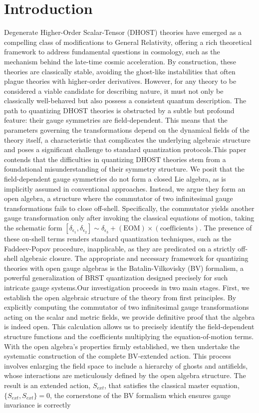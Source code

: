 \documentclass[twocolumn]{aastex631}
\begin{document}
\section{Introduction}
\label{sec:intro}
Degenerate Higher-Order Scalar-Tensor (DHOST) theories have emerged as a compelling class of modifications to General Relativity, offering a rich theoretical framework to address fundamental questions in cosmology, such as the mechanism behind the late-time cosmic acceleration. By construction, these theories are classically stable, avoiding the ghost-like instabilities that often plague theories with higher-order derivatives. However, for any theory to be considered a viable candidate for describing nature, it must not only be classically well-behaved but also possess a consistent quantum description. The path to quantizing DHOST theories is obstructed by a subtle but profound feature: their gauge symmetries are field-dependent. This means that the parameters governing the transformations depend on the dynamical fields of the theory itself, a characteristic that complicates the underlying algebraic structure and poses a significant challenge to standard quantization protocols.This paper contends that the difficulties in quantizing DHOST theories stem from a foundational misunderstanding of their symmetry structure. We posit that the field-dependent gauge symmetries do not form a closed Lie algebra, as is implicitly assumed in conventional approaches. Instead, we argue they form an open algebra, a structure where the commutator of two infinitesimal gauge transformations fails to close off-shell. Specifically, the commutator yields another gauge transformation only after invoking the classical equations of motion, taking the schematic form $[\delta_{\epsilon_1}, \delta_{\epsilon_2}] \sim \delta_{\epsilon_3} + (\text{EOM}) \times (\text{coefficients})$. The presence of these on-shell terms renders standard quantization techniques, such as the Faddeev-Popov procedure, inapplicable, as they are predicated on a strictly off-shell algebraic closure. The appropriate and necessary framework for quantizing theories with open gauge algebras is the Batalin-Vilkovisky (BV) formalism, a powerful generalization of BRST quantization designed precisely for such intricate gauge systems.Our investigation proceeds in two main stages. First, we establish the open algebraic structure of the theory from first principles. By explicitly computing the commutator of two infinitesimal gauge transformations acting on the scalar and metric fields, we provide definitive proof that the algebra is indeed open. This calculation allows us to precisely identify the field-dependent structure functions and the coefficients multiplying the equation-of-motion terms. With the open algebra's properties firmly established, we then undertake the systematic construction of the complete BV-extended action. This process involves enlarging the field space to include a hierarchy of ghosts and antifields, whose interactions are meticulously defined by the open algebra structure. The result is an extended action, $S_{ext}$, that satisfies the classical master equation, $\{S_{ext}, S_{ext}\} = 0$, the cornerstone of the BV formalism which ensures gauge invariance is correctly 
\end{document}

